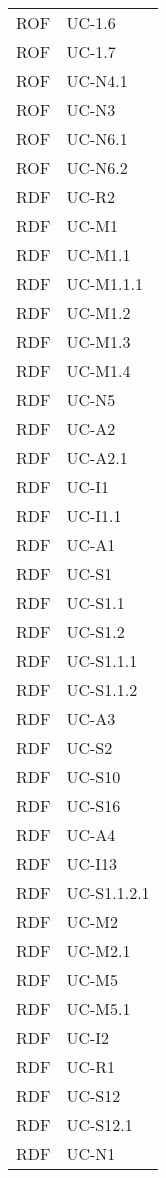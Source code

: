 \begin{longtable}{| p{5cm} | p{5cm} |}
		\rowcolor{LightGray}
		ROF & UC-1.6\\
		ROF & UC-1.7\\
		\rowcolor{LightGray}
		ROF & UC-N4.1\\
		ROF & UC-N3\\
		\rowcolor{LightGray}
		ROF & UC-N6.1\\
		ROF & UC-N6.2\\
		\rowcolor{LightGray}
		RDF & UC-R2\\
		RDF & UC-M1\\
		RDF & UC-M1.1 \\
		RDF & UC-M1.1.1 \\
		RDF & UC-M1.2 \\
		RDF & UC-M1.3 \\
		RDF & UC-M1.4 \\
		\rowcolor{LightGray}
		RDF & UC-N5\\
		RDF & UC-A2\\
		RDF & UC-A2.1\\
		\rowcolor{LightGray}
		RDF & UC-I1\\
		RDF & UC-I1.1\\
		RDF & UC-A1\\
		\rowcolor{LightGray}
		RDF & UC-S1\\
		RDF & UC-S1.1\\
		RDF & UC-S1.2\\
		\rowcolor{LightGray}
		RDF & UC-S1.1.1\\
		RDF & UC-S1.1.2\\
		\rowcolor{LightGray}
		RDF & UC-A3\\
		RDF & UC-S2\\
		\rowcolor{LightGray}
		RDF & UC-S10\\
		RDF & UC-S16\\
		\rowcolor{LightGray}
		RDF & UC-A4\\
		RDF & UC-I13 \\
		\rowcolor{LightGray}
		RDF & UC-S1.1.2.1 \\
		RDF & UC-M2 \\
		RDF & UC-M2.1 \\
		\rowcolor{LightGray}
		RDF & UC-M5 \\
		RDF & UC-M5.1 \\
		RDF & UC-I2 \\
		\rowcolor{LightGray}
		RDF & UC-R1 \\
		RDF & UC-S12 \\
		RDF & UC-S12.1 \\
		\rowcolor{LightGray}
		RDF & UC-N1\\

\end{longtable}
